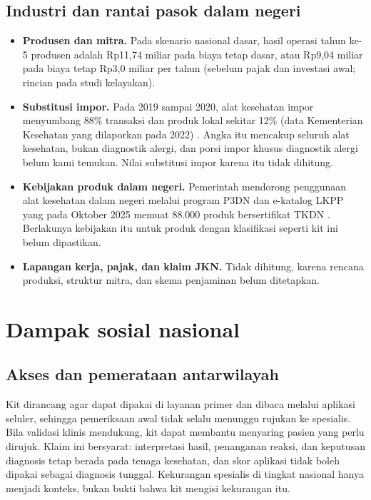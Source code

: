 \documentclass[11pt,a4paper]{article}
\begin{document}
\subsection{Industri dan rantai pasok dalam negeri}

\begin{itemize}
\item \textbf{Produsen dan mitra.} Pada skenario nasional dasar, hasil operasi tahun ke-5 produsen adalah Rp11,74 miliar pada biaya tetap dasar, atau Rp9,04 miliar pada biaya tetap Rp3,0 miliar per tahun (sebelum pajak dan investasi awal; rincian pada studi kelayakan).
\item \textbf{Substitusi impor.} Pada 2019 sampai 2020, alat kesehatan impor menyumbang 88\% transaksi dan produk lokal sekitar 12\% (data Kementerian Kesehatan yang dilaporkan pada 2022) \cite{kemkes88}. Angka itu mencakup seluruh alat kesehatan, bukan diagnostik alergi, dan porsi impor khusus diagnostik alergi belum kami temukan. Nilai substitusi impor karena itu tidak dihitung.
\item \textbf{Kebijakan produk dalam negeri.} Pemerintah mendorong penggunaan alat kesehatan dalam negeri melalui program P3DN \cite{p3dn} dan e-katalog LKPP yang pada Oktober 2025 memuat 88.000 produk bersertifikat TKDN \cite{ekatalog}. Berlakunya kebijakan itu untuk produk dengan klasifikasi seperti kit ini belum dipastikan.
\item \textbf{Lapangan kerja, pajak, dan klaim JKN.} Tidak dihitung, karena rencana produksi, struktur mitra, dan skema penjaminan belum ditetapkan.
\end{itemize}

\section{Dampak sosial nasional}

\subsection{Akses dan pemerataan antarwilayah}

Kit dirancang agar dapat dipakai di layanan primer dan dibaca melalui aplikasi seluler, sehingga pemeriksaan awal tidak selalu menunggu rujukan ke spesialis. Bila validasi klinis mendukung, kit dapat membantu menyaring pasien yang perlu dirujuk. Klaim ini bersyarat: interpretasi hasil, penanganan reaksi, dan keputusan diagnosis tetap berada pada tenaga kesehatan, dan skor aplikasi tidak boleh dipakai sebagai diagnosis tunggal. Kekurangan spesialis di tingkat nasional \cite{kabarbursa} hanya menjadi konteks, bukan bukti bahwa kit mengisi kekurangan itu.
\end{document}
